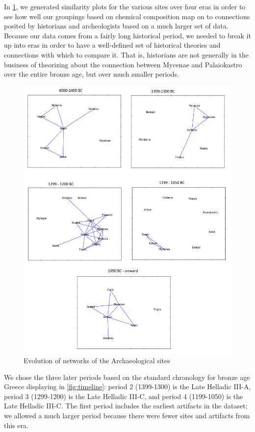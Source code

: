 


In \cref{fig:evolution}, we generated similarity plots for the various sites over four eras in order to see how well our groupings based on chemical composition map on to connections posited by historians and archeologists based on a much larger set of data. Because our data comes from a fairly long historical period, we needed to break it up into eras in order to have a well-defined set of historical theories and connections with which to compare it. That is, historians are not generally in the business of theorizing about the connection between Mycenae and Palaiokastro over the entire bronze age, but over much smaller periods. 



\begin{figure}
\includegraphics[width=\textwidth]{Network_evolution.png}
\caption{Evolution of networks of the Archaeological sites}
\label{fig:evolution}
\end{figure}


We chose the three later periods based on the standard chronology for bronze age Greece displaying in \cref{fig:timeline}: period 2 (1399-1300) is the Late Helladic III-A, period 3 (1299-1200) is the Late Helladic III-C, and period 4 (1199-1050) is the Late Helladic III-C. The first period includes the earliest artifacts in the dataset; we allowed a much larger period because there were fewer sites and artifacts from this era. 
  
